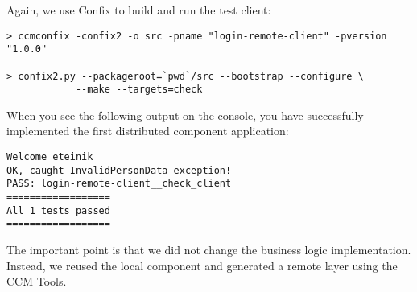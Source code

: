 Again, we use Confix to build and run the test client:
\begin{footnotesize}
\begin{verbatim}
> ccmconfix -confix2 -o src -pname "login-remote-client" -pversion "1.0.0"

> confix2.py --packageroot=`pwd`/src --bootstrap --configure \
            --make --targets=check
\end{verbatim}
\end{footnotesize}

When you see the following output on the console, you have successfully
implemented the first distributed component application:
\begin{footnotesize}
\begin{verbatim}
Welcome eteinik
OK, caught InvalidPersonData exception!
PASS: login-remote-client__check_client
==================
All 1 tests passed
==================
\end{verbatim}
\end{footnotesize}

The important point is that we did not change the business logic implementation.
Instead, we reused the local component and generated a remote layer using the
CCM Tools.

\newpage